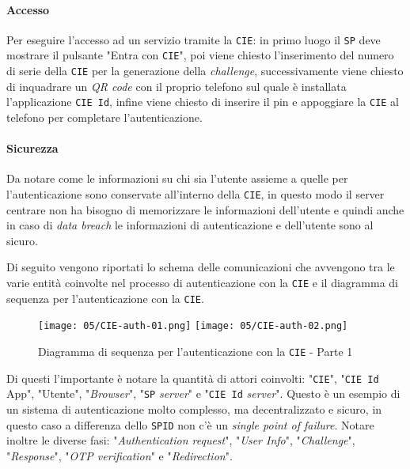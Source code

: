             \paragraph{Accesso} Per eseguire l'accesso ad un servizio tramite la \texttt{CIE}: in primo luogo il \texttt{SP} deve mostrare il pulsante "Entra con \texttt{CIE}", poi viene chiesto l'inserimento del numero di serie della \texttt{CIE} per la generazione della \textit{challenge}, successivamente viene chiesto di inquadrare un \textit{QR code} con il proprio telefono sul quale è installata l'applicazione \texttt{CIE Id}, infine viene chiesto di inserire il pin e appoggiare la \texttt{CIE} al telefono per completare l'autenticazione.
            
        \paragraph{Sicurezza} Da notare come le informazioni su chi sia l'utente assieme a quelle per l'autenticazione sono conservate all'interno della \texttt{CIE}, in questo modo il server centrare non ha bisogno di memorizzare le informazioni dell'utente e quindi anche in caso di \textit{data breach} le informazioni di autenticazione e dell'utente sono al sicuro.

        Di seguito vengono riportati lo schema delle comunicazioni che avvengono tra le varie entità coinvolte nel processo di autenticazione con la \texttt{CIE} e il diagramma di sequenza per l'autenticazione con la \texttt{CIE}.
        \newpage
        
        \begin{figure}[H]
            \centering
            \texttt{[image: 05/CIE-auth-01.png]}
            \texttt{[image: 05/CIE-auth-02.png]}
            \caption{Diagramma di sequenza per l'autenticazione con la \texttt{CIE} - Parte 1}
        \end{figure}

        Di questi l'importante è notare la quantità di attori coinvolti: "\texttt{CIE}", "\texttt{CIE Id} App", "Utente", "\textit{Browser}", "\texttt{SP} \textit{server}" e "\texttt{CIE Id} \textit{server}". Questo è un esempio di un sistema di autenticazione molto complesso, ma decentralizzato e sicuro, in questo caso a differenza dello \texttt{SPID} non c'è un \textit{single point of failure}. Notare inoltre le diverse fasi: "\textit{Authentication request}", "\textit{User Info}", "\textit{Challenge}", "\textit{Response}", "\textit{OTP verification}" e "\textit{Redirection}".
